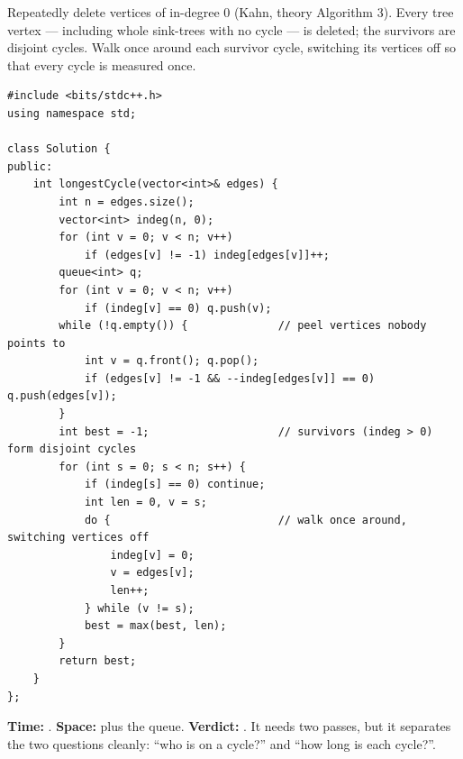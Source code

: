 \begin{alternativebox}
Repeatedly delete vertices of in-degree 0 (Kahn, theory Algorithm 3). Every tree vertex --- including whole sink-trees with no cycle --- is deleted; the survivors are disjoint cycles. Walk once around each survivor cycle, switching its vertices off so that every cycle is measured once.

\begin{lstlisting}[style=cpp]
#include <bits/stdc++.h>
using namespace std;

class Solution {
public:
    int longestCycle(vector<int>& edges) {
        int n = edges.size();
        vector<int> indeg(n, 0);
        for (int v = 0; v < n; v++)
            if (edges[v] != -1) indeg[edges[v]]++;
        queue<int> q;
        for (int v = 0; v < n; v++)
            if (indeg[v] == 0) q.push(v);
        while (!q.empty()) {              // peel vertices nobody points to
            int v = q.front(); q.pop();
            if (edges[v] != -1 && --indeg[edges[v]] == 0) q.push(edges[v]);
        }
        int best = -1;                    // survivors (indeg > 0) form disjoint cycles
        for (int s = 0; s < n; s++) {
            if (indeg[s] == 0) continue;
            int len = 0, v = s;
            do {                          // walk once around, switching vertices off
                indeg[v] = 0;
                v = edges[v];
                len++;
            } while (v != s);
            best = max(best, len);
        }
        return best;
    }
};
\end{lstlisting}

\begin{diagrambox}
\end{diagrambox}

\begin{complexitybox}
\textbf{Time:} . \textbf{Space:}  plus the queue. \textbf{Verdict:} \ac{}. It needs two passes, but it separates the two questions cleanly: ``who is on a cycle?'' and ``how long is each cycle?''.
\end{complexitybox}
\end{alternativebox}

